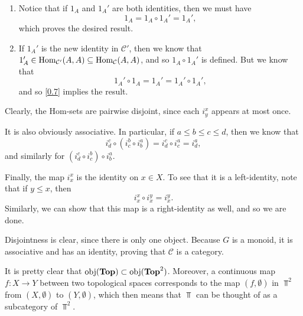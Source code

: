 \documentclass[../../solutions.tex]{subfiles}
\begin{document}
\begin{exercise} \leavevmode 
\begin{enumerate} 
\item Notice that if $1_A$ and $1_A'$ are both identities, then we must have \[1_A=1_A\circ 1_A'=1_A',\] which proves the desired result. 

\item If $1_A'$ is the new identity in $\mathcal C'$, then we know that $1_A'\in\operatorname{Hom}_{\mathcal C'}(A,A)\subseteq\operatorname{Hom}_{\mathcal C}(A,A)$, and so $1_A\circ 1_A'$ is defined. But we know that \[1_A'\circ1_A=1_A'=1_A'\circ1_A',\] and so \cref{0.7} implies the result. 
\end{enumerate} 
\end{exercise} 

\begin{exercise} \leavevmode
Clearly, the Hom-sets are pairwise disjoint, since each $i^x_y$ appears at most once. 

It is also obviously associative. In particular, if $a\le b\le c\le d$, then we know that \[i^c_d\circ\left(i^b_c\circ i^a_b\right)=i^c_d\circ i^a_c=i^a_d,\] and similarly for $\left(i^c_d\circ i^b_c\right)\circ i^a_b$. 

Finally, the map $i^x_x$ is the identity on $x\in X$. To see that it is a left-identity, note that if $y\le x$, then \[i_x^x\circ i_x^y=i_x^y.\] Similarly, we can show that this map is a right-identity as well, and so we are done. 
\end{exercise} 

\begin{exercise} \leavevmode
Disjointness is clear, since there is only one object. Because $G$ is a monoid, it is associative and has an identity, proving that $\mathcal C$ is a category. 
\end{exercise} 

\begin{exercise} \leavevmode
It is pretty clear that $\operatorname{obj}(\textbf{Top})\subset\operatorname{obj}(\textbf{Top}^2)$. Moreover, a continuous map $f:X\to Y$ between two topological spaces corresponds to the map $(f,\emptyset)$ in $\Top^2$ from $(X,\emptyset)$ to $(Y,\emptyset)$, which then means that $\Top$ can be thought of as a subcategory of $\Top^2$. 
\end{exercise} 
\end{document}
